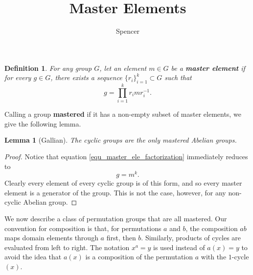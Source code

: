 \documentclass[12pt]{article}
\title{Master Elements}
\author{Spencer}
\newtheorem{definition}{Definition}[section]
\newtheorem{lemma}{Lemma}[section]
\begin{document}
\maketitle

\begin{definition}
For any group $G$, let an element $m\in G$ be a \textbf{master element} if for
every $g\in G$, there exists a sequence $\{r_i\}_{i=1}^k\subset G$ such that
\begin{equation}\label{equ_master_ele_factorization}
g = \prod_{i=1}^k r_imr_i^{-1}.
\end{equation}
\end{definition}

Calling a group \textbf{mastered} if it has a non-empty subset of master elements,
we give the following lemma.

\begin{lemma}[Gallian]
The cyclic groups are the only mastered Abelian groups.
\end{lemma}
\begin{proof}
Notice that equation \eqref{equ_master_ele_factorization} immediately reduces to
\begin{equation*}
g = m^k.
\end{equation*}
Clearly every element of every cyclic group is of this
form, and so every master element is a generator of the group.
This is not the case, however, for any non-cyclic Abelian group.
\end{proof}

We now describe a class of permutation groups that are all mastered.
Our convention for composition is that, for permutations $a$ and $b$, the
composition $ab$ maps domain elements through $a$ first, then $b$.
Similarly, products of cycles are evaluated from left to right.
The notation $x^a=y$ is used instead of $a(x)=y$ to avoid
the idea that $a(x)$ is a composition of the permutation $a$
with the $1$-cycle $(x)$.
\end{document}
